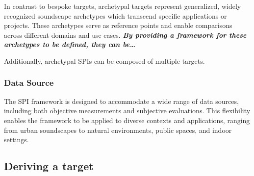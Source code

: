 \documentclass[
  authoryear,
  preprint,
  3p]{elsarticle}
\begin{document}
In contrast to bespoke targets, archetypal targets represent
generalized, widely recognized soundscape archetypes which transcend
specific applications or projects. These archetypes serve as reference
points and enable comparisons across different domains and use cases.
\textbf{\emph{By providing a framework for these archetypes to be
defined, they can be\ldots{}}}

Additionally, archetypal SPIs can be composed of multiple targets.

\subsubsection{Data Source}\label{data-source}

The SPI framework is designed to accommodate a wide range of data
sources, including both objective measurements and subjective
evaluations. This flexibility enables the framework to be applied to
diverse contexts and applications, ranging from urban soundscapes to
natural environments, public spaces, and indoor settings.

\subsection{Deriving a target}\label{deriving-a-target}


  
\end{document}
